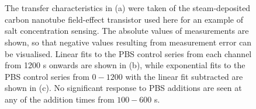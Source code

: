 \documentclass[
  a4paper,
]{scrbook}
\begin{document}
\begin{figure}
\begin{minipage}[t]{0.50\linewidth}
{{}

}

\subcaption{\label{fig-linear-fit}}
\end{minipage}%
\newline
\begin{minipage}[t]{0.28\linewidth}

{\centering 

~

}

\end{minipage}%
%
\begin{minipage}[t]{0.45\linewidth}

{\centering 


}

\subcaption{\label{fig-exp-fit}}
\end{minipage}%
%
\begin{minipage}[t]{0.28\linewidth}

{\centering 

~

}

\end{minipage}%

\caption{\label{fig-salt-conc-control-series}The transfer
characteristics in (a) were taken of the steam-deposited carbon nanotube
field-effect transistor used here for an example of salt concentration
sensing. The absolute values of measurements are shown, so that negative
values resulting from measurement error can be visualised. Linear fits
to the PBS control series from each channel from 1200 s onwards are
shown in (b), while exponential fits to the PBS control series from
\(0-1200\) with the linear fit subtracted are shown in (c). No
significant response to PBS additions are seen at any of the addition
times from \(100-600\) s.}

\end{figure}
\end{document}
